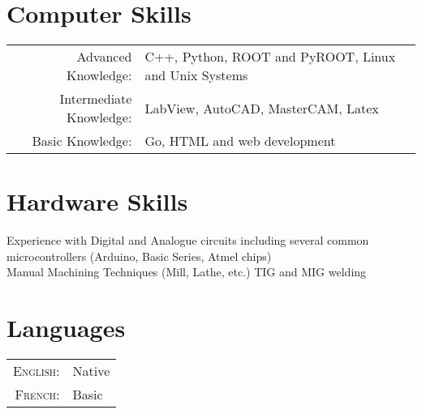 \documentclass[a4paper,10pt]{article} %
\begin{document}

\section{Computer Skills}

\begin{tabular}{rl}

Advanced Knowledge: & C++, Python, ROOT and PyROOT, Linux and Unix Systems \\
Intermediate Knowledge: & LabView, AutoCAD, MasterCAM, Latex\\
Basic Knowledge:        & Go, HTML and web development
\end{tabular}


\section{Hardware Skills}

Experience with Digital and Analogue circuits including several common microcontrollers (Arduino, Basic Series, Atmel chips) \\
Manual Machining Techniques (Mill, Lathe, etc.) TIG and MIG welding\\



\section{Languages}

\begin{tabular}{rl}
\textsc{English:} & Native\\

\textsc{French:} & Basic \\
\end{tabular}

\newpage


\end{document}
